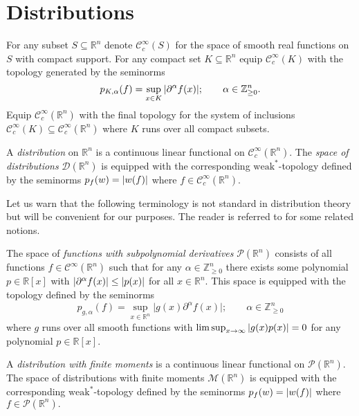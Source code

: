 \section{Distributions}\label{sec: Distributions}
For any subset $S\subseteq \mathbb{R}^n$ denote $\mathcal{C}_c^\infty(S)$ for the space of smooth real functions on $S$ with compact support.
For any compact set $K\subseteq \mathbb{R}^n$ equip $\mathcal{C}^\infty_c(K)$ with the topology generated by the seminorms
$$p_{K,\alpha}(f) = \sup_{x\in K} \vert \partial^\alpha f(x) \vert;\qquad \alpha\in \mathbb{Z}_{\geq 0}^n.$$
Equip $\mathcal{C}_c^\infty(\mathbb{R}^n)$ with the final topology for the system of inclusions $\mathcal{C}_c^\infty(K)\subseteq \mathcal{C}_c^\infty(\mathbb{R}^n)$ where $K$ runs over all compact subsets.
\begin{definition}\label{def: Distribution}
  A {\it distribution} on $\mathbb{R}^n$ is a continuous linear functional on $\mathcal{C}_c^\infty(\mathbb{R}^n)$.
  The {\it space of distributions} $\mathcal{D}(\mathbb{R}^n)$ is equipped with the corresponding $\text{weak}^*$-topology defined by the seminorms $p_{f}(w) = \vert w(f) \vert$ where $f\in \mathcal{C}_c^\infty(\mathbb{R}^n).$
\end{definition}
Let us warn that the following terminology is not standard in distribution theory but will be convenient for our purposes.
The reader is referred to \cite[Chapter 4]{horvath2012topological} for some related notions.
\begin{definition}
  The space of {\it functions with subpolynomial derivatives} $\mathcal{P}(\mathbb{R}^n)$ consists of all functions $f\in \mathcal{C}^\infty(\mathbb{R}^n)$ such that for any $\alpha\in \mathbb{Z}_{\geq 0}^n$ there exists some polynomial $p\in \mathbb{R}[x]$ with $\vert \partial^\alpha f(x) \vert\leq \vert p(x) \vert$ for all $x\in\mathbb{R}^n$.
  This space is equipped with the topology defined by the seminorms $$p_{g,\alpha}(f) = \sup_{x\in \mathbb{R}^n} \vert g(x)\partial^\alpha f(x)\vert ;\qquad \alpha\in \mathbb{Z}_{\geq 0}^n$$
  where $g$ runs over all smooth functions with $\limsup_{x\to \infty} \vert g(x)p(x) \vert = 0$ for any polynomial $p\in \mathbb{R}[x]$.
\end{definition}
\begin{definition}\label{def: DistributionWithMoments}
  A {\it distribution with finite moments} is a continuous linear functional on $\mathcal{P}(\mathbb{R}^n)$.
  The space of distributions with finite moments $\mathcal{M}(\mathbb{R}^n)$ is equipped with the corresponding $\text{weak}^*$-topology defined by the seminorms  $p_{f}(w) = \vert w(f) \vert$ where $f\in \mathcal{P}(\mathbb{R}^n).$
\end{definition}
